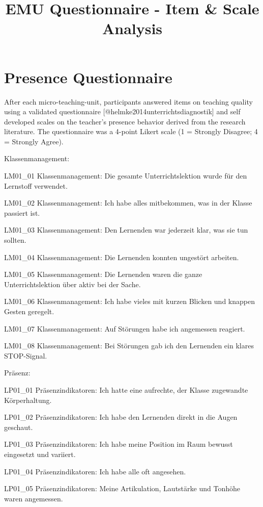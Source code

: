 \documentclass[
]{article}
\title{EMU Questionnaire - Item \& Scale Analysis}
\author{}
\date{\vspace{-2.5em}}
\begin{document}
\maketitle

\section{Presence Questionnaire}\label{presence-questionnaire}

After each micro-teaching-unit, participants answered items on teaching
quality using a validated questionnaire
{[}@helmke2014unterrichtsdiagnostik{]} and self developed scales on the
teacher's presence behavior derived from the research literature. The
questionnaire was a 4-point Likert scale (1 = Strongly Disagree; 4 =
Strongly Agree).

Klassenmanagement:

LM01\_01 Klassenmanagement: Die gesamte Unterrichtslektion wurde für den
Lernstoff verwendet.

LM01\_02 Klassenmanagement: Ich habe alles mitbekommen, was in der
Klasse passiert ist.

LM01\_03 Klassenmanagement: Den Lernenden war jederzeit klar, was sie
tun sollten.

LM01\_04 Klassenmanagement: Die Lernenden konnten ungestört arbeiten.

LM01\_05 Klassenmanagement: Die Lernenden waren die ganze
Unterrichtslektion über aktiv bei der Sache.

LM01\_06 Klassenmanagement: Ich habe vieles mit kurzen Blicken und
knappen Gesten geregelt.

LM01\_07 Klassenmanagement: Auf Störungen habe ich angemessen reagiert.

LM01\_08 Klassenmanagement: Bei Störungen gab ich den Lernenden ein
klares STOP-Signal.

Präsenz:

LP01\_01 Präsenzindikatoren: Ich hatte eine aufrechte, der Klasse
zugewandte Körperhaltung.

LP01\_02 Präsenzindikatoren: Ich habe den Lernenden direkt in die Augen
geschaut.

LP01\_03 Präsenzindikatoren: Ich habe meine Position im Raum bewusst
eingesetzt und variiert.

LP01\_04 Präsenzindikatoren: Ich habe alle oft angesehen.

LP01\_05 Präsenzindikatoren: Meine Artikulation, Lautstärke und Tonhöhe
waren angemessen.
\end{document}
